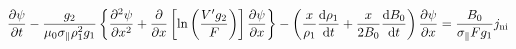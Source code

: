 \begin{equation}
\frac{{\partial \psi }}{{\partial t}} - \frac{{{g_2}}}{{{\mu _0}{\sigma _\parallel }\rho _{\rm{1}}^2{g_1}}}\left\{ {\frac{{{\partial ^2}\psi }}{{\partial {x^2}}} + \frac{\partial }{{\partial x}}\left[ {\ln \left( {\frac{{V'{g_2}}}{F}} \right)} \right]\frac{{\partial \psi }}{{\partial x}}} \right\} - \left( {\frac{x}{{{\rho _1}}}\frac{{{\rm{d}}{\rho _1}}}{{{\rm{d}}t}} + \frac{x}{{2{B_0}}}\frac{{{\rm{d}}{B_0}}}{{{\rm{d}}t}}} \right)\frac{{\partial \psi }}{{\partial x}} = \frac{{{B_0}}}{{{\sigma _\parallel }F{g_1}}}{j_{{\rm{ni}}}}
\end{equation}


